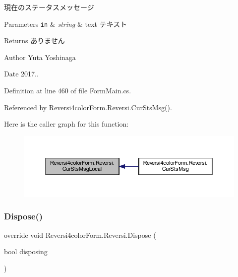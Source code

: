 現在のステータスメッセージ 


\begin{DoxyParams}[1]{Parameters}
\mbox{\tt in}  & {\em string} & text テキスト \\
\hline
\end{DoxyParams}
\begin{DoxyReturn}{Returns}
ありません 
\end{DoxyReturn}
\begin{DoxyAuthor}{Author}
Yuta Yoshinaga 
\end{DoxyAuthor}
\begin{DoxyDate}{Date}
2017.. 
\end{DoxyDate}


Definition at line 460 of file Form\+Main.\+cs.



Referenced by Reversi4color\+Form.\+Reversi.\+Cur\+Sts\+Msg().

Here is the caller graph for this function\+:\nopagebreak
\begin{figure}[H]
\begin{center}
\leavevmode
\includegraphics[width=350pt]{class_reversi4color_form_1_1_reversi_a663e1d055e099d0855df8a34af31edf9_icgraph}
\end{center}
\end{figure}
\mbox{\label{class_reversi4color_form_1_1_reversi_aa6fa1c8eae6d12a2e4f310ef0acddbb1}} 
\subsubsection{\texorpdfstring{Dispose()}{Dispose()}}
{\footnotesize\ttfamily override void Reversi4color\+Form.\+Reversi.\+Dispose (\begin{DoxyParamCaption}\item[{bool}]{disposing }\end{DoxyParamCaption})\hspace{0.3cm}{\ttfamily [protected]}}



